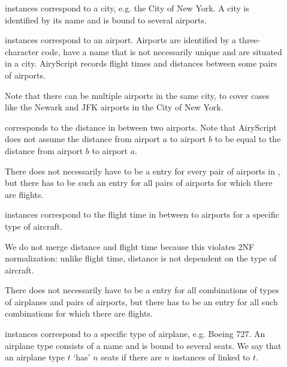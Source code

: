 \begin{description}
  \item[] instances correspond to a city, e.g. the City of New York. A
    city is identified by its name and is bound to several airports.

  \item[] instances correspond to an airport. Airports are
    identified by a three-character code, have a name that is not necessarily
    unique and are situated in a city. AiryScript records flight times and
    distances between some pairs of airports. 
    
    Note that there can be multiple airports in the same city, to cover cases
    like the Newark and JFK airports in the City of New York.

  \item[] corresponds to the distance in between two airports.
    Note that AiryScript does not assume the distance from airport $a$ to
    airport $b$ to be equal to the distance from airport $b$ to airport $a$.

    There does not necessarily have to be a  entry for every pair
    of airports in , but there has to be such an entry for all
    pairs of airports for which there are flights.

  \item[] instances correspond to the flight time in between to
    airports for a specific type of aircraft.
    
    We do not merge distance and flight time because this violates 2NF
    normalization: unlike flight time, distance is not dependent on the type of
    aircraft.

    There does not necessarily have to be a  entry for all
    combinations of types of airplanes and pairs of airports, but there has to
    be an entry for all such combinations for which there are flights.

  \item[] instances correspond to a specific type of airplane,
    e.g.  Boeing 727. An airplane type consists of a name and is bound to
    several seats. We say that an airplane type $t$ ‘has’ $n$ seats if there are
    $n$ instances of  linked to $t$.


\end{description}
